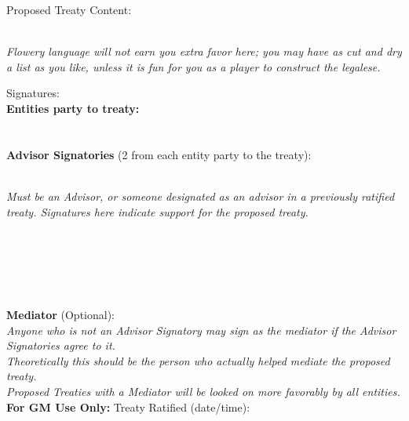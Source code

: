 \documentclass[white]{GL2020}
\begin{document}
\name{\wTreatyTemplate{}}

{\Large Proposed Treaty Content:}\\
\vspace{-1cm{}}\\
\begin{adjustwidth}{0cm}{5cm}\emph{Flowery language will not earn you extra favor here; you may have as cut and dry a list as you like, unless it is fun for you as a player to construct the legalese.}\\\end{adjustwidth}

\vspace{10cm{}}
{\Large Signatures:}\\
\textbf{Entities party to treaty:}\underline{\hspace{13.5cm}}\\
\vspace{-2mm{}}\\
\underline{\hspace{17cm}}
\vspace{0.5cm{}}\\
\textbf{Advisor Signatories} (2 from each entity party to the treaty):\\
\vspace{-1cm{}}\\
\begin{adjustwidth}{0cm}{5cm}\emph{Must be an Advisor, or someone designated as an advisor in a previously ratified treaty. Signatures here indicate support for the proposed treaty.}\end{adjustwidth}

\underline{\hspace{8cm}} \hspace{1cm} \underline{\hspace{8cm}}\\
\vspace{-2mm{}}\\
\underline{\hspace{8cm}} \hspace{1cm} \underline{\hspace{8cm}}\\
\vspace{-2mm{}}\\
\underline{\hspace{8cm}} \hspace{1cm} \underline{\hspace{8cm}}\\


\textbf{Mediator} (Optional):
\underline{\hspace{10cm}}\\
\emph{Anyone who is not an Advisor Signatory may sign as the mediator if the Advisor Signatories agree to it.}\\
\emph{Theoretically this should be the person who actually helped mediate the proposed treaty.}\\
\emph{Proposed Treaties with a Mediator will be looked on more favorably by all entities.}\\

\textbf{For GM Use Only:} Treaty Ratified (date/time):\underline{\hspace{8cm}}
\end{document}
